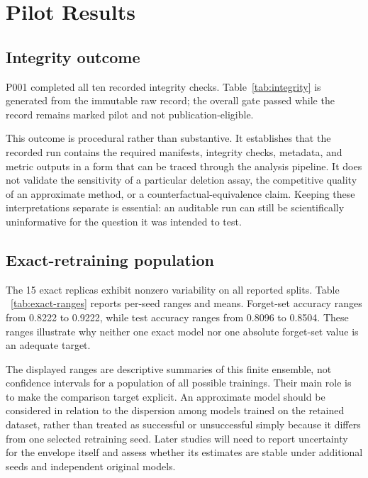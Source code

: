 \section{Pilot Results}
\subsection{Integrity outcome}
P001 completed all ten recorded integrity checks. Table~\ref{tab:integrity} is generated
from the immutable raw record; the overall gate passed while the record remains marked
pilot and not publication-eligible.

This outcome is procedural rather than substantive. It establishes that the recorded run
contains the required manifests, integrity checks, metadata, and metric outputs in a form
that can be traced through the analysis pipeline. It does not validate the sensitivity of a
particular deletion assay, the competitive quality of an approximate method, or a
counterfactual-equivalence claim. Keeping these interpretations separate is essential: an
auditable run can still be scientifically uninformative for the question it was intended to
test.
\begin{table}[ht]
\centering
\caption{P001 integrity-gate outcomes generated from the raw experiment record.}
\label{tab:integrity}
\small

\end{table}

\subsection{Exact-retraining population}
The 15 exact replicas exhibit nonzero variability on all reported splits. Table
~\ref{tab:exact-ranges} reports per-seed ranges and means. Forget-set accuracy ranges from
0.8222 to 0.9222, while test accuracy ranges from 0.8096 to 0.8504. These ranges illustrate
why neither one exact model nor one absolute forget-set value is an adequate target.

The displayed ranges are descriptive summaries of this finite ensemble, not confidence
intervals for a population of all possible trainings. Their main role is to make the
comparison target explicit. An approximate model should be considered in relation to the
dispersion among models trained on the retained dataset, rather than treated as successful
or unsuccessful simply because it differs from one selected retraining seed. Later studies
will need to report uncertainty for the envelope itself and assess whether its estimates
are stable under additional seeds and independent original models.
\begin{table}[ht]
\centering
\caption{Metric ranges across 15 independently exact-retrained models. NLL is negative
log-likelihood and ECE uses 15 bins.}
\label{tab:exact-ranges}
\small

\end{table}

